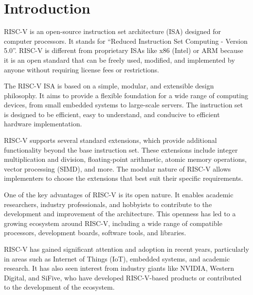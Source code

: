 \chapter{Introduction}

RISC-V is an open-source instruction set architecture (ISA) designed for computer processors. It stands for ``Reduced Instruction Set Computing - Version 5.0''. RISC-V is different from proprietary ISAs like x86 (Intel) or ARM because it is an open standard that can be freely used, modified, and implemented by anyone without requiring license fees or restrictions.

The RISC-V ISA is based on a simple, modular, and extensible design philosophy. It aims to provide a flexible foundation for a wide range of computing devices, from small embedded systems to large-scale servers. The instruction set is designed to be efficient, easy to understand, and conducive to efficient hardware implementation.

RISC-V supports several standard extensions, which provide additional functionality beyond the base instruction set. These extensions include integer multiplication and division, floating-point arithmetic, atomic memory operations, vector processing (SIMD), and more. The modular nature of RISC-V allows implementers to choose the extensions that best suit their specific requirements.

One of the key advantages of RISC-V is its open nature. It enables academic researchers, industry professionals, and hobbyists to contribute to the development and improvement of the architecture. This openness has led to a growing ecosystem around RISC-V, including a wide range of compatible processors, development boards, software tools, and libraries.

RISC-V has gained significant attention and adoption in recent years, particularly in areas such as Internet of Things (IoT), embedded systems, and academic research. It has also seen interest from industry giants like NVIDIA, Western Digital, and SiFive, who have developed RISC-V-based products or contributed to the development of the ecosystem.

